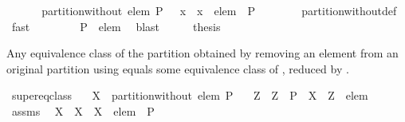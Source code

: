 \begin{isabellebody}
%
\isadelimproof
%
\endisadelimproof
%
\isatagproof
{}\isamarkupfalse%
\ {\isacharminus}\isanewline
\ \ \isamarkupfalse%
\ {\isachardoublequoteopen}{\isasymUnion}\ partition{\isacharunderscore}without\ elem\ P\ {\isacharequal}\ {\isasymUnion}\ {\isacharparenleft}{\isacharparenleft}{\isasymlambda}x\ {\isachardot}\ x\ {\isacharminus}\ {\isacharbraceleft}elem{\isacharbraceright}{\isacharparenright}\ {\isacharbackquote}\ P\ {\isacharminus}\ {\isacharbraceleft}{\isacharbraceleft}{\isacharbraceright}{\isacharbraceright}{\isacharparenright}{\isachardoublequoteclose}\isanewline
\ \ \ \ \isamarkupfalse%
\ partition{\isacharunderscore}without{\isacharunderscore}def\ \isamarkupfalse%
\ fast\isanewline
\ \ \isamarkupfalse%
\ \isamarkupfalse%
\ {\isachardoublequoteopen}{\isasymdots}\ {\isacharequal}\ {\isasymUnion}\ P\ {\isacharminus}\ {\isacharbraceleft}elem{\isacharbraceright}{\isachardoublequoteclose}\ \isamarkupfalse%
\ blast\isanewline
\ \ \isamarkupfalse%
\ \isamarkupfalse%
\ {\isacharquery}thesis\ \isacommand{{\isachardot}}\isamarkupfalse%
\isanewline
{}\isamarkupfalse%
%
\endisatagproof
{\isafoldproof}%
%
\isadelimproof
%
\endisadelimproof
%
\begin{isamarkuptext}%
Any equivalence class of the partition obtained by removing an element  from an
  original partition  using  equals some equivalence
  class of , reduced by .%
\end{isamarkuptext}%
\isamarkuptrue%
\isamarkupfalse%
\ super{\isacharunderscore}eq{\isacharunderscore}class{\isacharcolon}\isanewline
\ \ \ {\isachardoublequoteopen}X\ {\isasymin}\ partition{\isacharunderscore}without\ elem\ P{\isachardoublequoteclose}\isanewline
\ \ \ Z\ \ {\isachardoublequoteopen}Z\ {\isasymin}\ P{\isachardoublequoteclose}\ \ {\isachardoublequoteopen}X\ {\isacharequal}\ Z\ {\isacharminus}\ {\isacharbraceleft}elem{\isacharbraceright}{\isachardoublequoteclose}\isanewline
%
\isadelimproof
%
\endisadelimproof
%
\isatagproof
{}\isamarkupfalse%
\ {\isacharminus}\isanewline
\ \ \isamarkupfalse%
\ assms\ \isamarkupfalse%
\ {\isachardoublequoteopen}X\ {\isasymin}\ {\isacharparenleft}{\isasymlambda}X\ {\isachardot}\ X\ {\isacharminus}\ {\isacharbraceleft}elem{\isacharbraceright}{\isacharparenright}\ {\isacharbackquote}\ P\ {\isacharminus}\ {\isacharbraceleft}{\isacharbraceleft}{\isacharbraceright}{\isacharbraceright}{\isachardoublequoteclose}\ \isamarkupfalse%

\end{isabellebody}
